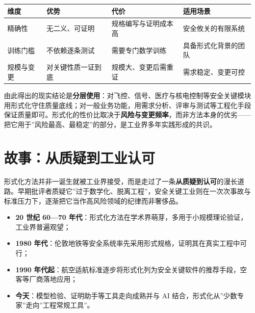 \documentclass[12pt,a4paper,twoside,openany]{ctexbook}
\numberwithin{figure}{chapter}
\numberwithin{table}{chapter}
\providecommand{\tightlist}{\setlength{\itemsep}{0pt}\setlength{\parskip}{0pt}}
\newcounter{none}
\begin{document}
{\def\LTcaptype{none} %
\begin{longtable}[]{@{}
  >{\raggedright\arraybackslash}p{}
  >{\raggedright\arraybackslash}p{}
  >{\raggedright\arraybackslash}p{}
  >{\raggedright\arraybackslash}p{}@{}}
\toprule\noalign{}
\begin{minipage}[b]{\linewidth}\raggedright
维度
\end{minipage} & \begin{minipage}[b]{\linewidth}\raggedright
优势
\end{minipage} & \begin{minipage}[b]{\linewidth}\raggedright
代价
\end{minipage} & \begin{minipage}[b]{\linewidth}\raggedright
适用场景
\end{minipage} \\
\midrule\noalign{}
\endhead
\bottomrule\noalign{}
\endlastfoot
精确性 & 无二义、可证明 & 规格编写与证明成本高 & 安全攸关的有限系统 \\
训练门槛 & 不依赖逐条测试 & 需要专门数学训练 & 具备形式化背景的团队 \\
规模与变更 & 对关键性质一证到底 & 规模大、变更后需重证 &
需求稳定、变更可控 \\
\end{longtable}
}

由此得出的现实结论是\textbf{分层使用}：对飞控、信号、医疗与核电控制等安全关键模块用形式化守住质量底线；对一般业务功能，用需求分析、评审与测试等工程化手段保证质量即可。形式化的性价比取决于\textbf{风险与变更频率}，而非方法本身的优劣------把它用于''风险最高、最稳定''的部分，是工业界多年实践形成的共识。

\section{故事：从质疑到工业认可}\label{ux6545ux4e8bux4eceux8d28ux7591ux5230ux5de5ux4e1aux8ba4ux53ef}

形式化方法并非一诞生就被工业界接受，而是走过了一条\textbf{从质疑到认可}的漫长道路。早期批评者质疑它''过于数学化、脱离工程''，安全关键工业则在一次次事故与标准压力下，逐渐把它当作高风险领域的纪律而非奢侈品。

\begin{itemize}
\tightlist
\item
  \textbf{20 世纪 60---70
  年代}：形式化方法在学术界萌芽，多用于小规模理论验证，工业界普遍观望；
\item
  \textbf{1980
  年代}：伦敦地铁等安全系统率先采用形式规格，证明其在真实工程中可行；
\item
  \textbf{1990
  年代起}：航空适航标准逐步将形式化列为安全关键软件的推荐手段，空客等厂商落地应用；
\item
  \textbf{今天}：模型检验、证明助手等工具走向成熟并与 AI
  结合，形式化从''少数专家''走向''工程常规工具''。
\end{itemize}
\end{document}
